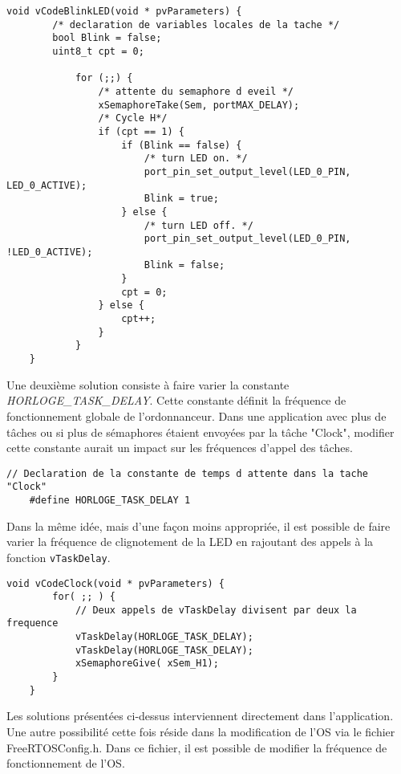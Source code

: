 \begin{lstlisting}[style=CStyle]
    void vCodeBlinkLED(void * pvParameters) { 
        /* declaration de variables locales de la tache */ 
        bool Blink = false;
        uint8_t cpt = 0;
        
            for (;;) { 
                /* attente du semaphore d eveil */ 
                xSemaphoreTake(Sem, portMAX_DELAY); 
                /* Cycle H*/ 
                if (cpt == 1) {
                    if (Blink == false) {
                        /* turn LED on. */
                        port_pin_set_output_level(LED_0_PIN, LED_0_ACTIVE);
                        Blink = true;
                    } else {
                        /* turn LED off. */
                        port_pin_set_output_level(LED_0_PIN, !LED_0_ACTIVE);
                        Blink = false;
                    }
                    cpt = 0;
                } else {
                    cpt++;
                }
            } 
    } 
\end{lstlisting}

Une deuxième solution consiste à faire varier la constante \textit{HORLOGE\_TASK\_DELAY}.
Cette constante définit la fréquence de fonctionnement globale de l'ordonnanceur.
Dans une application avec plus de tâches ou si plus de sémaphores étaient envoyées par la tâche "Clock", modifier cette constante aurait un impact sur les fréquences d'appel des tâches.

\begin{lstlisting}[style=CStyle]
    // Declaration de la constante de temps d attente dans la tache "Clock"
    #define HORLOGE_TASK_DELAY 1
\end{lstlisting}

Dans la même idée, mais d'une façon moins appropriée, il est possible de faire varier la fréquence de clignotement de la LED en rajoutant des appels à la fonction \texttt{vTaskDelay}.

\begin{lstlisting}[style=CStyle]
    void vCodeClock(void * pvParameters) {
        for( ;; ) {
            // Deux appels de vTaskDelay divisent par deux la frequence
            vTaskDelay(HORLOGE_TASK_DELAY);
            vTaskDelay(HORLOGE_TASK_DELAY);
            xSemaphoreGive( xSem_H1);
        }
    }
\end{lstlisting}

Les solutions présentées ci-dessus interviennent directement dans l'application.
Une autre possibilité cette fois réside dans la modification de l'OS via le fichier FreeRTOSConfig.h.
Dans ce fichier, il est possible de modifier la fréquence de fonctionnement de l'OS.

